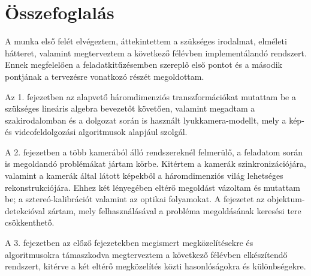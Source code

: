 \chapter{Összefoglalás}

A munka első felét elvégeztem, áttekintettem a szükséges irodalmat, elméleti hátteret, valamint megterveztem a következő félévben implementálandó rendszert. Ennek megfelelően a feladatkitűzésemben szereplő első pontot és a második pontjának a tervezésre vonatkozó részét megoldottam.

Az 1. fejezetben az alapvető háromdimenziós transzformációkat mutattam be a szükséges lineáris algebra bevezetőt követően, valamint megadtam a szakirodalomban és a dolgozat során is használt lyukkamera-modellt, mely a kép- és videofeldolgozási algoritmusok alapjául szolgál.

A 2. fejezetben a több kamerából álló rendszereknél felmerülő, a feladatom során is megoldandó problémákat jártam körbe. Kitértem a kamerák szinkronizációjára, valamint a kamerák által látott képekből a háromdimenziós világ lehetséges rekonstrukciójára. Ehhez két lényegében eltérő megoldást vázoltam és mutattam be; a sztereó-kalibrációt valamint az optikai folyamokat. A fejezetet az objektum-detekcióval zártam, mely felhasználásával a probléma megoldásának keresési tere csökkenthető.

A 3. fejezetben az előző fejezetekben megismert megközelítésekre és algoritmusokra támaszkodva megterveztem a következő félévben elkészítendő rendszert, kitérve a két eltérő megközelítés közti hasonlóságokra és különbségekre.